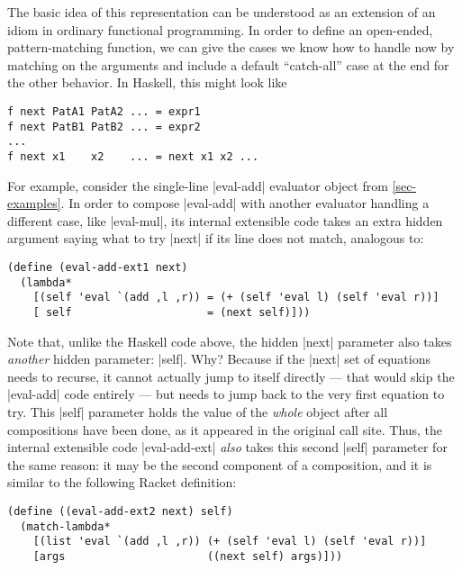 The basic idea of this representation can be understood as an extension of an idiom in ordinary functional programming.
In order to define an open-ended, pattern-matching function, we can give the cases we know how to handle now by matching on the arguments and include a default ``catch-all'' case at the end for the other behavior.
In Haskell, this might look like
\begin{lstlisting}[language=Hs]
f next PatA1 PatA2 ... = expr1
f next PatB1 PatB2 ... = expr2
...
f next x1    x2    ... = next x1 x2 ...
\end{lstlisting}

For example, consider the single-line \scm|eval-add| evaluator object from \cref{sec-examples}.
In order to compose \scm|eval-add| with another evaluator handling a different case, like \scm|eval-mul|, its internal extensible code takes an extra hidden argument saying what to try \scm|next| if its line does not match, analogous to:
\begin{lstlisting}[language=Scm]
(define (eval-add-ext1 next)
  (lambda*
    [(self 'eval `(add ,l ,r)) = (+ (self 'eval l) (self 'eval r))]
    [ self                     = (next self)]))
\end{lstlisting}
Note that, unlike the Haskell code above, the hidden \scm|next| parameter also takes \emph{another} hidden parameter: \scm|self|.
Why?
Because if the \scm|next| set of equations needs to recurse, it cannot actually jump to itself directly --- that would skip the \scm|eval-add| code entirely --- but needs to jump back to the very first equation to try.
This \scm|self| parameter holds the value of the \emph{whole} object after all compositions have been done, as it appeared in the original call site.
Thus, the internal extensible code \scm|eval-add-ext| \emph{also} takes this second \scm|self| parameter for the same reason: it may be the second component of a composition, and it is similar to the following Racket definition:
\begin{lstlisting}[language=Scm]
(define ((eval-add-ext2 next) self)
  (match-lambda*
    [(list 'eval `(add ,l ,r)) (+ (self 'eval l) (self 'eval r))]
    [args                      ((next self) args)]))
\end{lstlisting}

